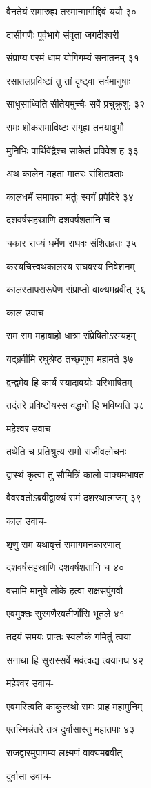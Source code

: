 वैनतेयं समारुह्य तस्मान्मार्गाद्दिवं ययौ ३०

दासीगणैः पूर्वभागे संवृता जगदीश्वरी

संप्राप्य परमं धाम योगिगम्यं सनातनम् ३१

रसातलप्रविष्टां तु तां दृष्ट्वा सर्वमानुषाः

साधुसाध्विति सीतेयमुच्चैः सर्वे प्रचुक्रुशुः ३२

रामः शोकसमाविष्टः संगृह्य तनयावुभौ

मुनिभिः पार्थिवेंद्रैश्च साकेतं प्रविवेश ह ३३

अथ कालेन महता मातरः संशितव्रताः

कालधर्मं समापन्ना भर्तुः स्वर्गं प्रपेदिरे ३४

दशवर्षसहस्राणि दशवर्षशतानि च

चकार राज्यं धर्मेण राघवः संशितव्रतः ३५

कस्यचित्त्वथकालस्य राघवस्य निवेशनम्

कालस्तापसरूपेण संप्राप्तो वाक्यमब्रवीत् ३६

काल उवाच-

राम राम महाबाहो धात्रा संप्रेषितोऽस्म्यहम्

यद्ब्रवीमि रघुश्रेष्ठ तच्छृणुष्व महामते ३७

द्वन्द्वमेव हि कार्यं स्यादावयोः परिभाषितम्

तदंतरे प्रविष्टोयस्स वद्ध्यो हि भविष्यति ३८

महेश्वर उवाच-

तथेति च प्रतिश्रुत्य रामो राजीवलोचनः

द्वास्थं कृत्वा तु सौमित्रिं कालो वाक्यमभाषत

वैवस्वतोऽब्रवीद्वाक्यं रामं दशरथात्मजम् ३९

काल उवाच-

शृणु राम यथावृत्तं समागमनकारणात्

दशवर्षसहस्राणि दशवर्षशतानि च ४०

वसामि मानुषे लोके हत्वा राक्षसपुंगवौ

एवमुक्तः सुरगणैरवतीर्णोसि भूतले ४१

तदयं समयः प्राप्तः स्वर्लोकं गमितुं त्वया

सनाथा हि सुरास्सर्वे भवंत्वद्य त्वयानघ ४२

महेश्वर उवाच-

एवमस्त्विति काकुत्स्थो रामः प्राह महामुनिम्

एतस्मिन्नंतरे तत्र दुर्वासास्तु महातपाः ४३

राजद्वारमुपागम्य लक्ष्मणं वाक्यमब्रवीत्

दुर्वासा उवाच-

